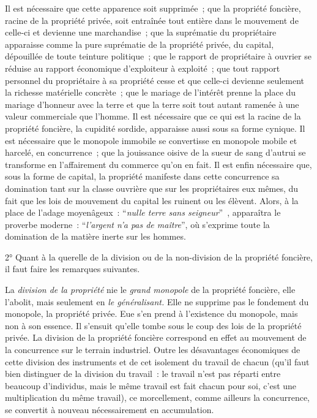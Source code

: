 \documentclass[french,twoside]{book} %
\newcommand\foreign[1]{\emph{#1}}
\begin{document}
Il est nécessaire que cette apparence soit supprimée ; que la propriété foncière, racine de la propriété privée, soit entraînée tout entière dans le mouvement de celle-ci et devienne une marchandise ; que la suprématie du propriétaire apparaisse comme la pure suprématie de la propriété privée, du capital, dépouillée de toute teinture politique ; que le rapport de propriétaire à ouvrier se réduise au rapport économique d’exploiteur à exploité ; que tout rapport personnel du propriétaire à sa propriété cesse et que celle-ci devienne seulement la richesse matérielle concrète ; que le mariage de l’intérêt prenne la place du mariage d’honneur avec la terre et que la terre soit tout autant ramenée à une valeur commerciale que l’homme. Il est nécessaire que ce qui est la racine de la propriété foncière, la cupidité sordide, apparaisse aussi sous sa forme cynique. Il est nécessaire que le monopole immobile se convertisse en monopole mobile et harcelé, en concurrence ; que la jouissance oisive de la sueur de sang d’autrui se transforme en l’affairement du commerce qu’on en fait. Il est enfin nécessaire que, sous la forme de capital, la propriété manifeste dans cette concurrence sa domination tant sur la classe ouvrière que sur les propriétaires eux mêmes, du fait que les lois de mouvement du capital les ruinent ou les élèvent. Alors, à la place de l’adage moyenâgeux : “\foreign{nulle terre sans seigneur}” , apparaîtra le proverbe moderne : “\foreign{l’argent n’a pas de maître}”, où s’exprime toute la domination de la matière inerte sur les hommes.\par
[XIX] 2° Quant à la querelle de la division ou de la non-division de la propriété foncière, il faut faire les remarques suivantes.\par
La \emph{division de la propriété} nie le \emph{grand monopole} de la propriété foncière, elle l’abolit, mais seulement en \emph{le généralisant.} Elle ne supprime pas le fondement du monopole, la propriété privée. Eue s’en prend à l’existence du monopole, mais non à son essence. Il s’ensuit qu’elle tombe sous le coup des lois de la propriété privée. La division de la propriété foncière correspond en effet au mouvement de la concurrence sur le terrain industriel. Outre les désavantages économiques de cette division des instruments et de cet isolement du travail de chacun (qu’il faut bien distinguer de la division du travail : le travail n’est pas réparti entre beaucoup d’individus, mais le même travail est fait chacun pour soi, c’est une multiplication du même travail), ce morcellement, comme ailleurs la concurrence, se convertit à nouveau nécessairement en accumulation.\par
\end{document}
